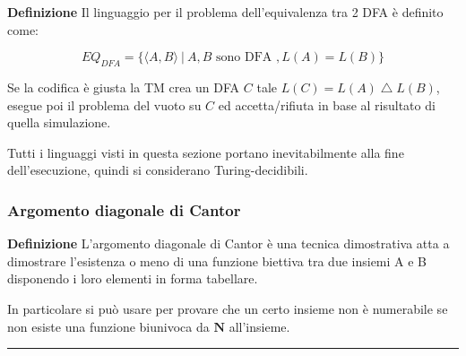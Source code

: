 \documentclass{article}
\begin{document}
\noindent\textbf{Definizione} Il linguaggio per il problema dell'equivalenza tra 2 DFA è definito come:

$$EQ_{DFA}=\{\langle A,B\rangle\ |\ A,B\text{ sono DFA },L(A)=L(B) \}$$\newline

\noindent Se la codifica è giusta la TM crea un DFA $C$ tale $L(C)=L(A)\bigtriangleup L(B)$, esegue poi il problema del vuoto su $C$ ed accetta/rifiuta in base al risultato di quella simulazione.\newline

\noindent Tutti i linguaggi visti in questa sezione portano inevitabilmente alla fine dell'esecuzione, quindi si considerano Turing-decidibili.

\subsubsection{Argomento diagonale di Cantor}

\textbf{Definizione} L’argomento diagonale di Cantor è una tecnica dimostrativa atta a dimostrare
l’esistenza o meno di una funzione biettiva tra due insiemi A e B disponendo
i loro elementi in forma tabellare.\newline

\noindent In particolare si può usare per provare che un certo insieme non è numerabile se non esiste una funzione biunivoca da $\mathbf{N}$ all'insieme.\newline

\newpage

\noindent\rule{\textwidth}{0.5pt}\newline
\end{document}
